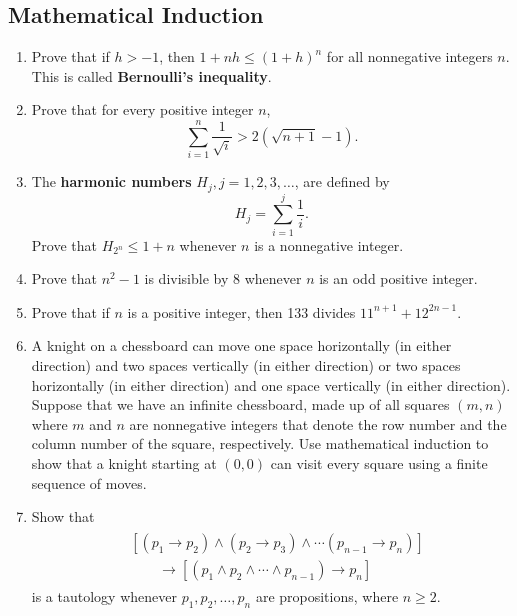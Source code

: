\documentclass{../../cls/sig-alternate-05-2015}
\begin{document}
\subsection{Mathematical Induction}
\begin{enumerate}
\item Prove that if $h > -1$, then $1 + nh \le (1 + h)^n$ for all nonnegative integers $n$. This is called \textbf{Bernoulli's inequality}.

\item Prove that for every positive integer $n$,
\begin{equation}
    \sum_{i = 1}^{n} \frac{1}{\sqrt{i}} > 2(\sqrt{n + 1} - 1).
\end{equation}

\item The \textbf{harmonic numbers} $H_j, j = 1, 2, 3, \ldots$, are defined by \begin{equation}
    H_j = \sum_{i = 1}^j \frac{1}{i}.
\end{equation}
Prove that $H_{2^n} \le 1 + n$ whenever $n$ is a nonnegative integer.

\item Prove that $n^2 - 1$ is divisible by 8 whenever $n$ is an odd positive integer.

\item Prove that if $n$ is a positive integer, then 133 divides
$11^{n + 1} + 12^{2n - 1}.$

\item A knight on a chessboard can move one space horizontally
(in either direction) and two spaces vertically (in
either direction) or two spaces horizontally (in either direction)
and one space vertically (in either direction).
Suppose that we have an infinite chessboard,
made up of all squares $(m, n)$ where $m$ and $n$ are nonnegative integers that denote the row number and the column number of the square,
respectively.
Use mathematical induction to show that a knight starting at $(0, 0)$ can visit every square using a finite sequence of moves.

\item Show that \begin{align}
\begin{aligned}
    & [(p_1 \rightarrow p_2) \land (p_2 \rightarrow p_3) \land \cdots (p_{n - 1} \rightarrow p_{n})]\\
    & \qquad \rightarrow [(p_1 \land p_2 \land \cdots \land p_{n - 1}) \rightarrow p_{n}]
\end{aligned}
\end{align} is a tautology whenever $p_1, p_2, \ldots, p_n$ are propositions, where $n \ge 2$.


\end{enumerate}
\end{document}
